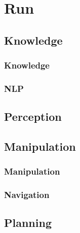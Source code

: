 \documentclass[main.tex]{subfiles}
\begin{document}
\newpage
	\section{Run}
	\subsection{Knowledge}
	\subsubsection{Knowledge}
	
	\subsubsection{NLP}
	
	\subsection{Perception}
	
	\subsection{Manipulation}
	\subsubsection{Manipulation}
	
	\subsubsection{Navigation}
	
	\subsection{Planning}
\end{document}
